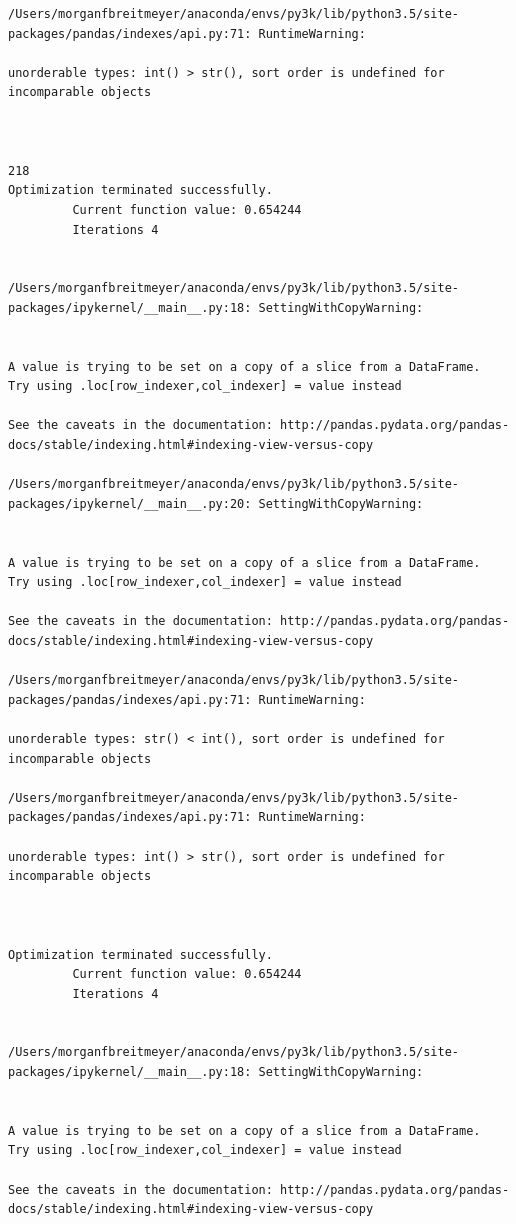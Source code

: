 \begin{lstlisting}
/Users/morganfbreitmeyer/anaconda/envs/py3k/lib/python3.5/site-packages/pandas/indexes/api.py:71: RuntimeWarning:

unorderable types: int() > str(), sort order is undefined for incomparable objects



218
Optimization terminated successfully.
         Current function value: 0.654244
         Iterations 4


/Users/morganfbreitmeyer/anaconda/envs/py3k/lib/python3.5/site-packages/ipykernel/__main__.py:18: SettingWithCopyWarning:


A value is trying to be set on a copy of a slice from a DataFrame.
Try using .loc[row_indexer,col_indexer] = value instead

See the caveats in the documentation: http://pandas.pydata.org/pandas-docs/stable/indexing.html#indexing-view-versus-copy

/Users/morganfbreitmeyer/anaconda/envs/py3k/lib/python3.5/site-packages/ipykernel/__main__.py:20: SettingWithCopyWarning:


A value is trying to be set on a copy of a slice from a DataFrame.
Try using .loc[row_indexer,col_indexer] = value instead

See the caveats in the documentation: http://pandas.pydata.org/pandas-docs/stable/indexing.html#indexing-view-versus-copy

/Users/morganfbreitmeyer/anaconda/envs/py3k/lib/python3.5/site-packages/pandas/indexes/api.py:71: RuntimeWarning:

unorderable types: str() < int(), sort order is undefined for incomparable objects

/Users/morganfbreitmeyer/anaconda/envs/py3k/lib/python3.5/site-packages/pandas/indexes/api.py:71: RuntimeWarning:

unorderable types: int() > str(), sort order is undefined for incomparable objects



Optimization terminated successfully.
         Current function value: 0.654244
         Iterations 4


/Users/morganfbreitmeyer/anaconda/envs/py3k/lib/python3.5/site-packages/ipykernel/__main__.py:18: SettingWithCopyWarning:


A value is trying to be set on a copy of a slice from a DataFrame.
Try using .loc[row_indexer,col_indexer] = value instead

See the caveats in the documentation: http://pandas.pydata.org/pandas-docs/stable/indexing.html#indexing-view-versus-copy


\end{lstlisting}
